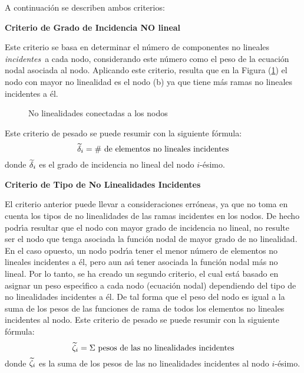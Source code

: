 \documentclass[conference,letterpaper,onecolumn]{IEEEtran}
\def\boldtild{\mathaccent"0365 }
\newcommand{\puttilde}[1]{\boldtild{\boldmath #1}}
\begin{document}
A continuaci\'on se describen ambos criterios:
\begin{description}
\item {\bf Criterio de Grado de Incidencia NO lineal}\hfill\par
Este criterio se basa en determinar el n\'umero de componentes no
li\-nea\-les {\em incidentes}\, a cada nodo, considerando este n\'umero
como el peso de la ecuaci\'on nodal asociada al nodo.
Aplicando este criterio, resulta que en la Figura (\ref{rams}) el
nodo con mayor no linealidad es el nodo ({\sf b}) ya que tiene m\'as
ramas no lineales incidentes a \'el.
\begin{figure}[!h]
\centerline{
\epsfxsize=120mm
}
\caption{No linealidades conectadas a los nodos}
\label{rams}
\end{figure}



Este criterio de pesado se puede resumir con la siguiente f\'ormula:
\begin{equation}
\puttilde{\delta}_i =  \mbox{\# de elementos no lineales incidentes}
\end{equation}
donde $\puttilde{\delta}_i$ es el grado de incidencia no lineal del nodo
$i$-\'esimo.

\item {\bf Criterio de Tipo de No Linealidades Incidentes}\hfill\par

El criterio anterior puede llevar a consideraciones err\'oneas, ya que
no toma en cuenta los tipos de no linealidades de las ramas incidentes en los nodos.
De hecho podr\'{\i}a resultar que el nodo con mayor grado de incidencia
no lineal, no resulte ser el nodo que tenga asociada la funci\'on nodal
de mayor grado de no linealidad.
En el caso opuesto, un nodo podr\'{\i}a tener el menor n\'umero de
elementos no lineales incidentes a \'el, pero aun as\'{\i} tener
asociada la funci\'on nodal m\'as no lineal. Por lo tanto, se ha creado un segundo criterio, el cual est\'a basado
en asignar un peso espec\'{\i}fico a cada nodo (ecuaci\'on nodal)
dependiendo del tipo de
no linealidades incidentes a \'el. De tal forma que el peso del nodo es igual a la suma de los pesos de las
funciones de rama de todos los elementos no lineales incidentes al nodo.
Este criterio de pesado se puede resumir con la siguiente f\'ormula:
\begin{equation}
\puttilde{\zeta}_i = \Sigma \mbox{ pesos de las no linealidades incidentes}
\end{equation}
donde $\puttilde{\zeta}_i$ es la suma de los pesos de las no linealidades
incidentes al nodo $i$-\'esimo.
\end{description}
\end{document}
